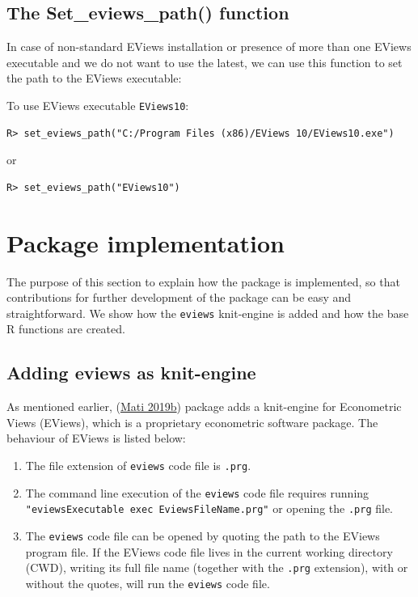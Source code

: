 \hypertarget{the-set_eviews_path-function}{%
\subsection{The Set\_eviews\_path() function}\label{the-set_eviews_path-function}}

In case of non-standard EViews installation or presence of more than one EViews executable and we do not want to use the latest, we can use this function to set the path to the EViews executable:

To use EViews executable \texttt{EViews10}:

\begin{verbatim}
R> set_eviews_path("C:/Program Files (x86)/EViews 10/EViews10.exe")
\end{verbatim}

or

\begin{verbatim}
R> set_eviews_path("EViews10")
\end{verbatim}

\hypertarget{sec-implementation}{%
\section{Package implementation}\label{sec-implementation}}

The purpose of this section to explain how the package is implemented, so that contributions for further development of the package can be easy and straightforward. We show how the \texttt{eviews} knit-engine is added and how the base R functions are created.

\hypertarget{sec-knit-engine}{%
\subsection{Adding eviews as knit-engine}\label{sec-knit-engine}}

As mentioned earlier,  (\protect\hyperlink{ref-Mati2019}{Mati 2019b}) package adds a knit-engine for Econometric Views (EViews), which is a proprietary econometric software package. The behaviour of EViews is listed below:

\begin{enumerate}
\def\labelenumi{\arabic{enumi}.}
\item
  The file extension of \texttt{eviews} code file is \texttt{.prg}.
\item
  The command line execution of the \texttt{eviews} code file requires running \texttt{"eviewsExecutable\ exec\ EviewsFileName.prg"} or opening the \texttt{.prg} file.
\item
  The \texttt{eviews} code file can be opened by quoting the path to the EViews program file. If the EViews code file lives in the current working directory (CWD), writing its full file name (together with the \texttt{.prg} extension), with or without the quotes, will run the \texttt{eviews} code file.
\end{enumerate}

